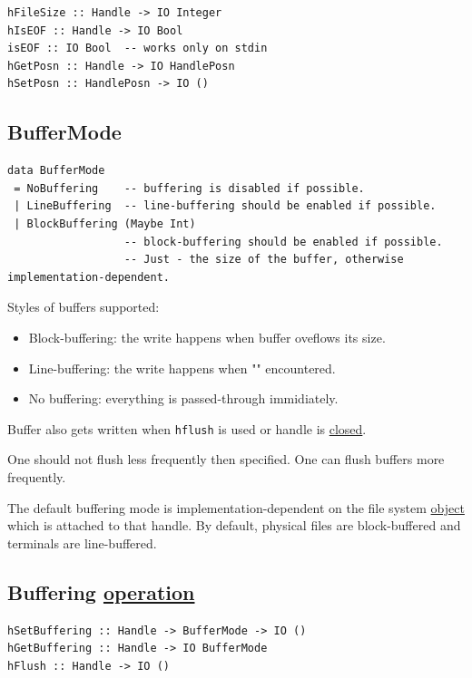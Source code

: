 \documentclass[a4paper,14pt,oneside]{book}
\begin{document}
\begin{verbatim}
hFileSize :: Handle -> IO Integer
hIsEOF :: Handle -> IO Bool
isEOF :: IO Bool  -- works only on stdin
hGetPosn :: Handle -> IO HandlePosn
hSetPosn :: HandlePosn -> IO ()
\end{verbatim}

\subsection{BufferMode}
\label{sec:org5813fbd}

\begin{verbatim}
data BufferMode
 = NoBuffering    -- buffering is disabled if possible.
 | LineBuffering  -- line-buffering should be enabled if possible.
 | BlockBuffering (Maybe Int)
                  -- block-buffering should be enabled if possible.
                  -- Just - the size of the buffer, otherwise implementation-dependent.
\end{verbatim}

Styles of buffers supported:

\begin{itemize}
\item Block-buffering: the write happens when buffer oveflows its size.
\item Line-buffering: the write happens when "\n" encountered.
\item No buffering: everything is passed-through immidiately.
\end{itemize}

Buffer also gets written when \texttt{hflush} is used or handle is \hyperref[org55dc967]{closed}.

One should not flush less frequently then specified.
One can flush buffers more frequently.

The default buffering mode is implementation-dependent on the file system \hyperref[orgcfdb5f4]{object} which is attached to that handle. By default, physical files are block-buffered and terminals are line-buffered.

\subsection{Buffering \hyperref[orgaf16e3c]{operation}}
\label{sec:org6275685}

\begin{verbatim}
hSetBuffering :: Handle -> BufferMode -> IO ()
hGetBuffering :: Handle -> IO BufferMode
hFlush :: Handle -> IO ()
\end{verbatim}
\end{document}
